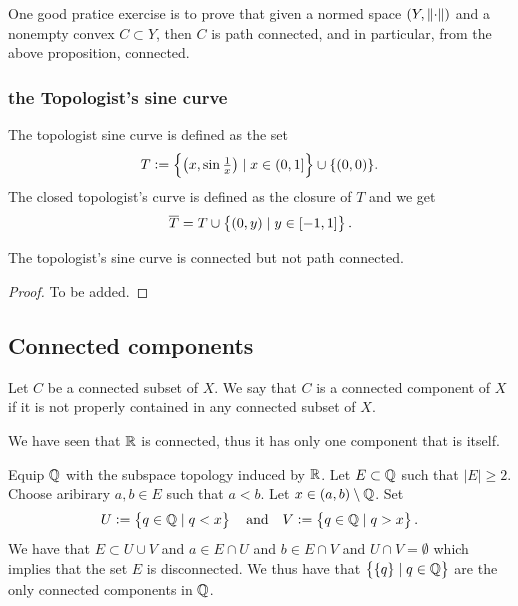 \documentclass[11pt,a4paper]{article}
\begin{document}
One good pratice exercise is to prove that given a normed space
$(Y,\left\lVert\cdot\right\rVert)$ and a nonempty convex $C \subset Y$, then $C$
is path connected, and in particular, from the above proposition, connected.

\subsubsection{the Topologist's sine curve}

\begin{definition}
  The topologist sine curve is defined as the set
  \[
  T := \set{\del{x,\sin {\tfrac {1}{x}}} \mid x\in (0,1]} \cup \{(0,0)\}.
  \]
  The closed topologist's curve is defined as the closure of $T$ and
  we get
  \[
    \overline T = T \cup \left\{(0,y) \mid y \in [-1,1]\right\}.
  \]
\end{definition}

\begin{proposition}
  The topologist's sine curve is connected but not path connected.
\end{proposition}
\begin{proof}
  To be added.
\end{proof}

\subsection{Connected components}

\begin{definition}
  Let $C$ be a connected subset of $X$.
  We say that $C$ is a connected component of $X$ 
  if it is not properly contained in any connected subset of $X$.
\end{definition}

\begin{example}
  We have seen that $\mathbb{R}$ is connected, thus it has only one component
  that is itself.
\end{example}

\begin{example}
  Equip $\mathbb{Q}$ with the subspace topology induced by $\mathbb{R}$.
  Let $E \subset \mathbb{Q}$ such that $|E| \geq 2$.
  Choose aribirary $a,b \in E$ such that $a < b$.
  Let $x \in (a,b) \setminus \mathbb{Q}$. Set
  \[
    U := \left\{q \in \mathbb{Q} \mid q < x\right\} \quad \text{and} \quad
    V := \left\{q \in \mathbb{Q} \mid q > x\right\}.
  \]
  We have that $E \subset U \cup V$ and $a \in E \cap U$ and
  $b \in E \cap V$ and $U \cap V = \emptyset$ which implies that
  the set $E$ is disconnected.
  We thus have that $\left\{\{q\} \mid q \in \mathbb{Q}\right\}$ are the only connected
  components in $\mathbb{Q}$.
\end{example}
\end{document}
